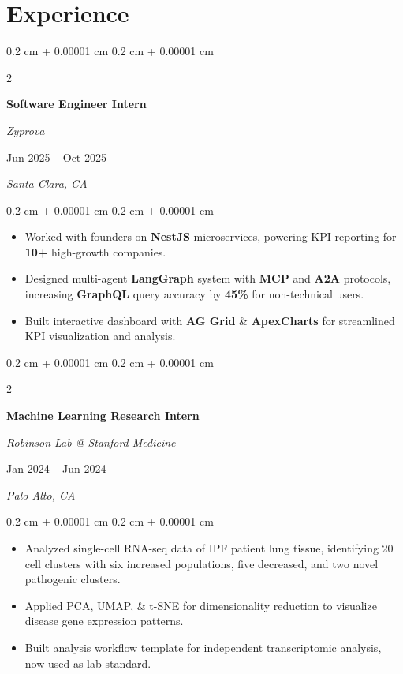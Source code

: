 \documentclass[10pt, letterpaper]{article}
\newenvironment{highlights}{
    \begin{itemize}[
        topsep=0.10 cm,
        parsep=0.10 cm,
        partopsep=0pt,
        itemsep=0pt,
        leftmargin=0.4 cm + 10pt
    ]
}{
    \end{itemize}
} %
\newenvironment{onecolentry}{
    \begin{adjustwidth}{
        0.2 cm + 0.00001 cm
    }{
        0.2 cm + 0.00001 cm
    }
}{
    \end{adjustwidth}
} %
\newenvironment{twocolentry}[2][]{
    \onecolentry
    \def\secondColumn{#2}
    \setcolumnwidth{\fill, 5 cm}
    \begin{paracol}{2}
}{
    \switchcolumn \raggedleft \secondColumn
    \end{paracol}
    \endonecolentry
} %
\let\hrefWithoutArrow\href
\renewcommand{\href}[2]{\hrefWithoutArrow{#1}{\ifthenelse{\equal{#2}{}}{ }{#2 }\raisebox{.15ex}{\footnotesize \faExternalLink*}}}
\begin{document}
    
    \section{Experience}



        
        \begin{twocolentry}{
        Jun 2025 – Oct 2025 
            
        \textit{Santa Clara, CA}}
            \textbf{Software Engineer Intern}
            
            \textit{Zyprova}
        \end{twocolentry}

        \vspace{0.10 cm}
        \begin{onecolentry}
            \begin{highlights}
                \item Worked with founders on \textbf{NestJS} microservices, powering KPI reporting for \textbf{10+} high-growth companies.
                \item Designed multi-agent \textbf{LangGraph} system with \textbf{MCP} and \textbf{A2A} protocols, increasing \textbf{GraphQL} query accuracy by \textbf{45\%} for non-technical users.
                \item Built interactive dashboard with \textbf{AG Grid} \& \textbf{ApexCharts} for streamlined KPI visualization and analysis.
            \end{highlights}
        \end{onecolentry}


        \vspace{0.3 cm}

        \begin{twocolentry}{
        Jan 2024 – Jun 2024    
            
        \textit{Palo Alto, CA}}
            \textbf{Machine Learning Research Intern}
            
            \textit{Robinson Lab @ Stanford Medicine}
        \end{twocolentry}

        \vspace{0.10 cm}
        \begin{onecolentry}
            \begin{highlights}
                \item Analyzed single-cell RNA-seq data of IPF patient lung tissue, identifying 20 cell clusters with six increased populations, five decreased, and two novel pathogenic clusters.
                \item Applied PCA, UMAP, \& t-SNE for dimensionality reduction to visualize disease gene expression patterns.
                \item Built analysis workflow template for independent transcriptomic analysis, now used as lab standard.
            \end{highlights}
        \end{onecolentry}
\end{document}
